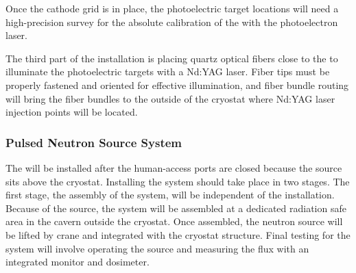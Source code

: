 Once the 
cathode grid is in place, the photoelectric target locations will need a high-precision survey %
for the absolute calibration of the \efield with the photoelectron laser. 

The third part of the installation is placing quartz optical fibers close to the  %
to illuminate the photoelectric targets with a Nd:YAG laser.  
Fiber tips must be properly fastened and oriented for effective illumination, and fiber bundle routing will bring the fiber bundles to the outside of the cryostat where Nd:YAG laser injection points will be located. 

\subsubsection{Pulsed Neutron Source System} 
The  will be installed after the human-access ports are closed because the source sits above the cryostat. Installing the system should take place in two stages. The first stage, the assembly of the system, will be independent of the  installation. Because of the source, the system will be assembled at a dedicated radiation safe area in the cavern %
outside the cryostat. Once assembled, the neutron source will be lifted by crane and integrated with the cryostat structure. Final  testing for the system will involve operating the source and measuring the flux with an integrated monitor and dosimeter.



